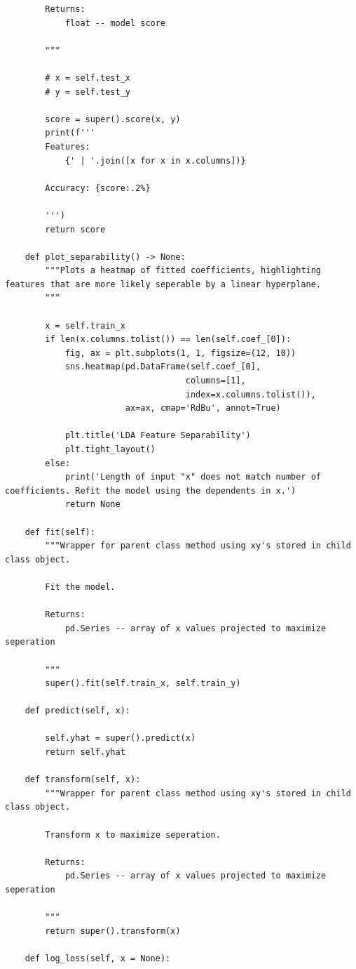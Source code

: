 \begin{verbatim}
        Returns:
            float -- model score

        """

        # x = self.test_x
        # y = self.test_y

        score = super().score(x, y)
        print(f'''
        Features:
            {' | '.join([x for x in x.columns])}

        Accuracy: {score:.2%}

        ''')
        return score

    def plot_separability() -> None:
        """Plots a heatmap of fitted coefficients, highlighting features that are more likely seperable by a linear hyperplane.
        """

        x = self.train_x
        if len(x.columns.tolist()) == len(self.coef_[0]):
            fig, ax = plt.subplots(1, 1, figsize=(12, 10))
            sns.heatmap(pd.DataFrame(self.coef_[0],
                                    columns=[1],
                                    index=x.columns.tolist()),
                        ax=ax, cmap='RdBu', annot=True)

            plt.title('LDA Feature Separability')
            plt.tight_layout()
        else:
            print('Length of input "x" does not match number of coefficients. Refit the model using the dependents in x.')
            return None

    def fit(self):
        """Wrapper for parent class method using xy's stored in child class object.

        Fit the model.

        Returns:
            pd.Series -- array of x values projected to maximize seperation

        """
        super().fit(self.train_x, self.train_y)

    def predict(self, x):

        self.yhat = super().predict(x)
        return self.yhat

    def transform(self, x):
        """Wrapper for parent class method using xy's stored in child class object.

        Transform x to maximize seperation.

        Returns:
            pd.Series -- array of x values projected to maximize seperation

        """
        return super().transform(x)

    def log_loss(self, x = None):


\end{verbatim}
